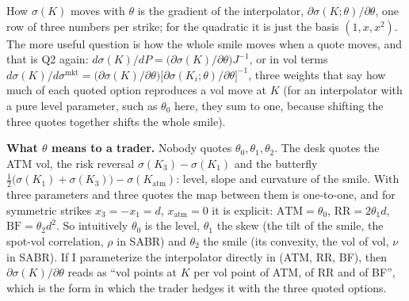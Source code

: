 \documentclass[10pt]{article}
\begin{document}
How $\sigma(K)$ moves with $\theta$ is the gradient of the interpolator, $\partial\sigma(K;\theta)/\partial\theta$, one row of three
numbers per strike; for the quadratic it is just the basis $(1,x,x^2)$. The more useful question is how the whole smile moves when a quote
moves, and that is Q2 again: $d\sigma(K)/dP=\bigl(\partial\sigma(K)/\partial\theta\bigr)J^{-1}$, or in vol terms
$d\sigma(K)/d\sigma^{\mathrm{mkt}}=\bigl(\partial\sigma(K)/\partial\theta\bigr)\bigl[\partial\sigma(K_i;\theta)/\partial\theta\bigr]^{-1}$,
three weights that say how much of each quoted option reproduces a vol move at $K$ (for an interpolator with a pure level parameter, such
as $\theta_0$ here, they sum to one, because shifting the three quotes together shifts the whole smile).

\textbf{What $\theta$ means to a trader.} Nobody quotes $\theta_0,\theta_1,\theta_2$. The desk quotes the ATM vol, the risk reversal
$\sigma(K_3)-\sigma(K_1)$ and the butterfly $\tfrac12\bigl(\sigma(K_1)+\sigma(K_3)\bigr)-\sigma(K_{\mathrm{atm}})$: level, slope and
curvature of the smile. With three parameters and three quotes the map between them is one-to-one, and for symmetric strikes
$x_3=-x_1=d$, $x_{\mathrm{atm}}=0$ it is explicit: $\mathrm{ATM}=\theta_0$, $\mathrm{RR}=2\theta_1d$, $\mathrm{BF}=\theta_2d^2$. So
intuitively $\theta_0$ is the level, $\theta_1$ the skew (the tilt of the smile, the spot-vol correlation, $\rho$ in SABR) and $\theta_2$
the smile (its convexity, the vol of vol, $\nu$ in SABR). If I parameterize the interpolator directly in (ATM, RR, BF), then
$\partial\sigma(K)/\partial\theta$ reads as ``vol points at $K$ per vol point of ATM, of RR and of BF'', which is the form in which the
trader hedges it with the three quoted options.
\end{document}

